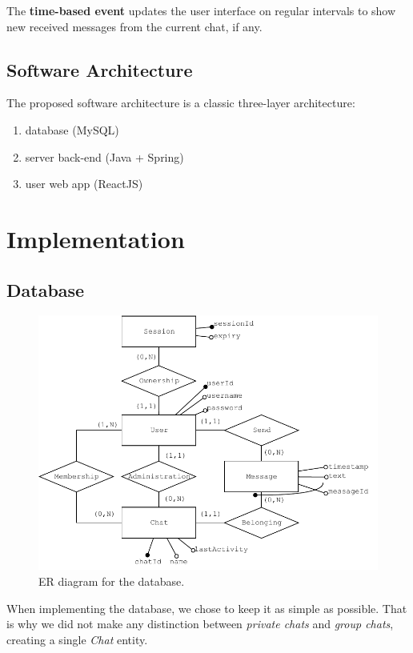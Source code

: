 \documentclass[10pt]{article}
\begin{document}
The \textbf{time-based event} updates the user interface on regular intervals
to show new received messages from the current chat, if any.

\subsection{Software Architecture}
The proposed software architecture is a classic three-layer architecture:
\begin{enumerate}
    \item database (MySQL)
    \item server back-end (Java + Spring)
    \item user web app (ReactJS)
\end{enumerate}

\section{Implementation}

\subsection{Database}
\begin{figure}[]
    \centering
    \includegraphics[width=\textwidth]{figs/ER}
    \caption{ER diagram for the database.}
    \label{fig:er}
\end{figure}

When implementing the database, we chose to keep it as simple as possible. 
That is why we did not make any distinction between \emph{private chats} and 
\emph{group chats}, creating a single \emph{Chat} entity.
\end{document}
